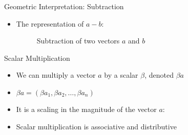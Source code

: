 \begin{frame}{Geometric Interpretation: Subtraction}
\begin{itemize}
    \item The representation of $a-b$:
    \begin{figure}[h]
        \centering
        \caption{Subtraction of two vectors $a$ and $b$}
        \label{fig:vector-subtraction}
    \end{figure}
\end{itemize}
\end{frame}

\begin{frame}{Scalar Multiplication}
\begin{itemize}
    \item We can multiply a vector $a$ by a scalar $\beta$, denoted $\beta a$
    \item $\beta a = (\beta a_1, \beta a_2, \ldots, \beta a_n)$
    \item It is a scaling in the magnitude of the vector $a$:
    \begin{center}
    \end{center}
    \item Scalar multiplication is associative and distributive
\end{itemize}
\end{frame}

